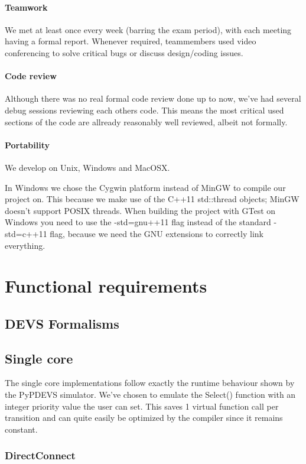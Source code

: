 \documentclass[8pt,a4paper]{report}
\begin{document}
\subsubsection{Teamwork}
We met at least once every week (barring the exam period), with each meeting having a formal report. Whenever required, teammembers used video conferencing to solve critical bugs or discuss design/coding issues.
\subsubsection{Code review}
Although there was no real formal code review done up to now, we've had several debug sessions reviewing each others code. This means the most critical used sections of the code are allready reasonably well reviewed, albeit not formally.
\subsubsection{Portability}
We develop on Unix, Windows and MacOSX.

In Windows we chose the Cygwin platform instead of MinGW to compile our project on. This because we make use of the C++11 std::thread objects; MinGW doesn't support POSIX threads. When building the project with GTest on Windows you need to use the -std=gnu++11 flag instead of the standard -std=c++11 flag, because we need the GNU extensions to correctly link everything.

\chapter{Functional requirements}
\section{DEVS Formalisms}
\section{Single core}
The single core implementations follow exactly the runtime behaviour shown by the PyPDEVS simulator. We've chosen to emulate the Select() function with an integer priority value the user can set. This saves 1 virtual function call per transition and can quite easily be optimized by the compiler since it remains constant.
\subsection{DirectConnect}
\end{document}
